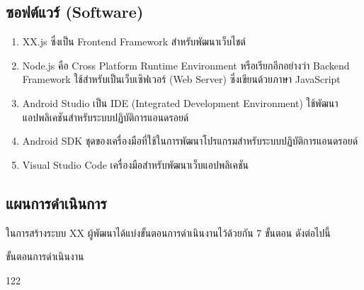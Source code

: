 \subsection{ซอฟต์แวร์ (Software)}
\begin{enumerate}
	\item XX.js ซึ่งเป็น Frontend Framework สำหรับพัฒนาเว็บไชต์ 
	\item Node.js คือ Cross Platform Runtime Environment หรือเรียกอีกอย่างว่า Backend Framework ใช้สำหรับเป็นเว็บเซิฟเวอร์ (Web Server) ซึ่งเขียนด้วยภาษา JavaScript 
	\item Android Studio เป็น IDE (Integrated Development Environment) ใช้พัฒนาแอปพลิเคชันสำหรับระบบปฏิบัติการแอนดรอยด์
	\item Android SDK ชุดของเครื่องมือที่ใช้ในการพัฒนาโปรแกรมสำหรับระบบปฏิบัติการแอนดรอยด์
	\item Visual Studio Code เครื่องมือสำหรับพัฒนาเว็บแอปพลิเคชัน
\end{enumerate}

\newpage
\subsection{แผนการดำเนินการ}
	ในการสร้างระบบ XX ผู้พัฒนาได้แบ่งขั้นตอนการดำเนินงานไว้ด้วยกัน 7 ขั้นตอน ดังต่อไปนี้

\begin{table}[H]
	\noindent
	\caption{ขั้นตอนการดำเนินงาน}
	\begin{ganttchart}[
		canvas/.append style={fill=none, draw=black!5, line width=.75pt},
		vgrid={*2{draw=black!7, line width=.75pt}},
		title label font=\bfseries\footnotesize,
		bar label node/.append style={
			align=left,
			text width=width("7. Functional Testing On")},
		bar/.append style={draw=none, fill=black!63}
		]{1}{22}
		\\
		 \\
		 \\
		 \\
		 \\
		 \\
		 \\
		 \\
		 \\
		 \\
	\end{ganttchart}
	\label{tab:ganttchart}
\end{table}
